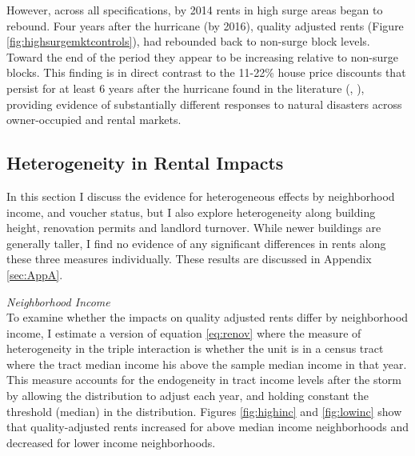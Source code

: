 \documentclass[12pt]{article}
\begin{document}
{{{{{However, across all specifications, by 2014 rents in high surge areas began to rebound.   Four years after the hurricane (by 2016), quality adjusted rents (Figure \ref{fig:highsurgemktcontrols}),  had rebounded back to non-surge block levels.  Toward the end of the period they appear to be increasing relative to non-surge blocks. This finding is in direct contrast to the 11-22\% house price discounts that persist for at least 6 years after the hurricane found in the literature (\cite{ellen_heterogeneity_2022}, \cite{ortega_rising_2018}), providing evidence of substantially different responses to natural disasters across owner-occupied and rental markets.  


\subsection{Heterogeneity in Rental Impacts}
In this section I discuss the evidence for heterogeneous effects by neighborhood income, and voucher status, but I also explore heterogeneity along building height, renovation permits and landlord turnover. While newer buildings are generally taller, I find no evidence of any significant differences in rents along these three measures individually.  These results are discussed in Appendix \ref{sec:AppA}. 

\textit{Neighborhood Income} \\
To examine whether the impacts on quality adjusted rents differ by neighborhood income, I estimate a version of equation \ref{eq:renov} where the measure of heterogeneity in the triple interaction is whether the unit is in a census tract where the tract median income his above the sample median income in that year.  This measure accounts for the endogeneity in tract income levels after the storm by allowing the distribution to adjust each year, and holding constant the threshold (median) in the distribution. Figures \ref{fig:highinc} and \ref{fig:lowinc} show that quality-adjusted rents increased for above median income neighborhoods and decreased for lower income neighborhoods. 

}}}}}
\end{document}
